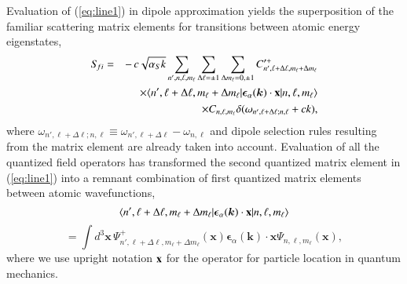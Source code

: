 \documentclass[final,3p,12pt]{elsarticle3}
\begin{document}
Evaluation of (\ref{eq:line1}) in dipole approximation yields the superposition 
of the familiar scattering matrix elements for transitions between atomic 
energy eigenstates,
\begin{eqnarray}\nonumber
S_{\!fi}&=&-\,c\sqrt{\alpha_S k}
\sum_{n',n,\ell,m_\ell}\sum_{\Delta\ell=\pm 1}\sum_{\Delta m_\ell=0,\pm 1}
C'^+_{n',\ell+\Delta\ell,m_\ell+\Delta m_\ell}
\\ \nonumber
&&\times
\langle n',\ell+\Delta\ell,m_\ell+\Delta m_\ell|
\bm{\epsilon}_\alpha(\bm{k})\cdot\mathrm{\bf x}|n,\ell,m_\ell\rangle
\\ \label{eq:line2}
&&\times
C_{n,\ell,m_\ell}\delta(\omega_{n',\ell+\Delta\ell;n,\ell}+ck),
\end{eqnarray}
where $\omega_{n',\ell+\Delta\ell;n,\ell}\equiv\omega_{n',\ell+\Delta\ell}-\omega_{n,\ell}$
and dipole selection rules resulting from the matrix element are 
already taken into account. Evaluation of all the quantized field operators
has transformed the second quantized matrix element in (\ref{eq:line1}) 
into a remnant combination of first quantized matrix elements between 
atomic wavefunctions,
\[
\langle n',\ell+\Delta\ell,m_\ell+\Delta m_\ell|
\bm{\epsilon}_\alpha(\bm{k})\cdot\mathrm{\bf x}|n,\ell,m_\ell\rangle
\]
\[
=\int\!d^3\bm{x}\,\Psi^+_{n',\ell+\Delta\ell,m_\ell+\Delta m_\ell}(\bm{x})
\bm{\epsilon}_\alpha(\bm{k})\cdot\bm{x}\Psi_{n,\ell,m_\ell}(\bm{x}),
\]
where we use upright notation $\mathrm{\bf x}$ for the
operator for particle location in quantum mechanics.
\end{document}
